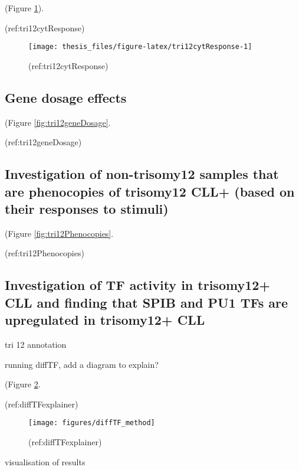\documentclass[11pt, a4paper, twosided]{book}
\begin{document}
(Figure \ref{fig:tri12cytResponse}).

(ref:tri12cytResponse)
\begin{figure}

{\centering \texttt{[image: thesis\_files/figure-latex/tri12cytResponse-1]} 

}

\caption{(ref:tri12cytResponse)}\label{fig:tri12cytResponse}
\end{figure}
\hypertarget{gene-dosage-effects}{%
\subsection{Gene dosage effects}\label{gene-dosage-effects}}

(Figure \ref{fig:tri12geneDosage}.

(ref:tri12geneDosage)

\hypertarget{investigation-of-non-trisomy12-samples-that-are-phenocopies-of-trisomy12-cll-based-on-their-responses-to-stimuli}{%
\subsection{Investigation of non-trisomy12 samples that are phenocopies of trisomy12 CLL+ (based on their responses to stimuli)}\label{investigation-of-non-trisomy12-samples-that-are-phenocopies-of-trisomy12-cll-based-on-their-responses-to-stimuli}}

(Figure \ref{fig:tri12Phenocopies}.

(ref:tri12Phenocopies)

\hypertarget{investigation-of-tf-activity-in-trisomy12-cll-and-finding-that-spib-and-pu1-tfs-are-upregulated-in-trisomy12-cll}{%
\subsection{Investigation of TF activity in trisomy12+ CLL and finding that SPIB and PU1 TFs are upregulated in trisomy12+ CLL}\label{investigation-of-tf-activity-in-trisomy12-cll-and-finding-that-spib-and-pu1-tfs-are-upregulated-in-trisomy12-cll}}

tri 12 annotation

running diffTF, add a diagram to explain?

(Figure \ref{fig:diffTFexplainer}.

(ref:diffTFexplainer)
\begin{figure}

{\centering \texttt{[image: figures/diffTF\_method]} 

}

\caption{(ref:diffTFexplainer)}\label{fig:diffTFexplainer}
\end{figure}
visualisation of results
\end{document}
